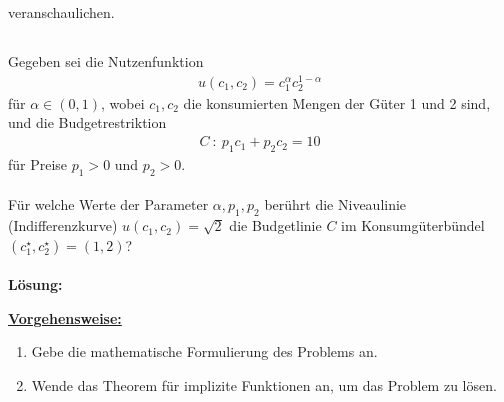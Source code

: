 veranschaulichen.

\newpage
\subsection*{}
Gegeben sei die Nutzenfunktion
\begin{align*}
u(c_1,c_2) = c_1^\alpha c_2^{1-\alpha}
\end{align*}
für $ \alpha \in (0,1) $, wobei $ c_1,c_2 $ die konsumierten Mengen der Güter 1 und 2 sind, und die Budgetrestriktion
\begin{align*}
C \ : \ p_1 c_1 + p_2 c_2 = 10
\end{align*}
für Preise $ p_1 > 0  $ und $ p_2 > 0 $.\\
\\
Für welche Werte der Parameter $ \alpha, p_1, p_2 $ berührt die Niveaulinie (Indifferenzkurve) $ u(c_1,c_2) = \sqrt{2} $ die Budgetlinie $ C $ im Konsumgüterbündel $ (c_1^\star,c_2^\star)  = (1,2)$?
\\
\\
\textbf{Lösung:}
\begin{mdframed}
\underline{\textbf{Vorgehensweise:}}
\renewcommand{\labelenumi}{\theenumi.}
\begin{enumerate}
\item Gebe die mathematische Formulierung des Problems an.
\item Wende das Theorem für implizite Funktionen an, um das Problem zu lösen.
\end{enumerate}
\end{mdframed}

